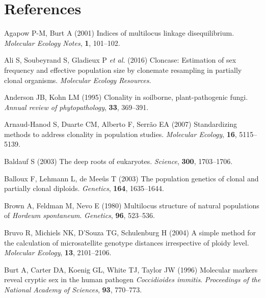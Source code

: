 \documentclass[double,12pt]{beavtex}
\begin{document}
  \chapter{References}\label{references}
  
  \noindent
  
  \setlength{\parindent}{-0.20in} \setlength{\leftskip}{0.20in}
  \setlength{\parskip}{8pt}
  
  \hypertarget{refs}{}
  \hypertarget{ref-Agapowux5f2001}{}
  Agapow P-M, Burt A (2001) Indices of multilocus linkage disequilibrium.
  \emph{Molecular Ecology Notes}, \textbf{1}, 101--102.
  
  \hypertarget{ref-ali2016cloncase}{}
  Ali S, Soubeyrand S, Gladieux P \emph{et al.} (2016) Cloncase:
  Estimation of sex frequency and effective population size by clonemate
  resampling in partially clonal organisms. \emph{Molecular Ecology
  Resources}.
  
  \hypertarget{ref-anderson1995clonality}{}
  Anderson JB, Kohn LM (1995) Clonality in soilborne, plant-pathogenic
  fungi. \emph{Annual review of phytopathology}, \textbf{33}, 369--391.
  
  \hypertarget{ref-arnaud2007standardizing}{}
  Arnaud-Hanod S, Duarte CM, Alberto F, Serrão EA (2007) Standardizing
  methods to address clonality in population studies. \emph{Molecular
  Ecology}, \textbf{16}, 5115--5139.
  
  \hypertarget{ref-baldauf2003deep}{}
  Baldauf S (2003) The deep roots of eukaryotes. \emph{Science},
  \textbf{300}, 1703--1706.
  
  \hypertarget{ref-balloux2003population}{}
  Balloux F, Lehmann L, de Meeûs T (2003) The population genetics of
  clonal and partially clonal diploids. \emph{Genetics}, \textbf{164},
  1635--1644.
  
  \hypertarget{ref-brown1980multilocus}{}
  Brown A, Feldman M, Nevo E (1980) Multilocus structure of natural
  populations of \emph{Hordeum spontaneum}. \emph{Genetics}, \textbf{96},
  523--536.
  
  \hypertarget{ref-bruvo2004simple}{}
  Bruvo R, Michiels NK, D'Souza TG, Schulenburg H (2004) A simple method
  for the calculation of microsatellite genotype distances irrespective of
  ploidy level. \emph{Molecular Ecology}, \textbf{13}, 2101--2106.
  
  \hypertarget{ref-burt1996molecular}{}
  Burt A, Carter DA, Koenig GL, White TJ, Taylor JW (1996) Molecular
  markers reveal cryptic sex in the human pathogen \emph{Coccidioides
  immitis}. \emph{Proceedings of the National Academy of Sciences},
  \textbf{93}, 770--773.
  
\end{document}
